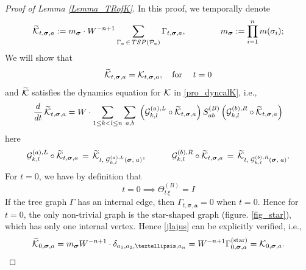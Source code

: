 \documentclass[10pt,reqno]{article}
\theoremstyle{plain} %
\theoremstyle{remark}
\numberwithin{equation}{section}
\begin{document}
\begin{proof}[Proof of Lemma \ref{Lemma_TRofK}]
 In this proof, we temporally denote 
   $$
   \widetilde{ {\cal K}}_{t, \boldsymbol{\sigma}, \textbf{a}}:= m_{\boldsymbol{\sigma}}\cdot W^{-n+1}    \sum_{\Gamma_{\textbf{a}}\, \in\,  {TSP}({\cal P}_{\textbf{a}})}  \Gamma_{t, \boldsymbol{\sigma}, \textbf{a}},\quad \quad \quad \quad m_{\boldsymbol{\sigma}}:=\prod_{i=1}^n m(\sigma_i);
   $$
   We will show that 
  \begin{equation}\label{jlajus}
     \widetilde{ {\cal K}}_{t, \boldsymbol{\sigma}, \textbf{a}}
   =
    { {\cal K}}_{t, \boldsymbol{\sigma}, \textbf{a}},\quad  \text{for} \; \quad  t=0   \end{equation}
and   $\widetilde{\cal K}$ satisfies the dynamics equation for $ \cal K$ in \eqref{pro_dyncalK}, i.e., 
  \begin{align}\label{pjlacalK}
       \frac{d}{dt}\, \widetilde{ {\cal K}}_{t, \boldsymbol{\sigma}, \textbf{a}} 
       =  
       {W}\cdot  \sum_{1 \le k < l \le n} \sum_{a, b} \; \left( {\cal G}^{(a), L}_{k, l} \circ  \widetilde{ {\cal K}}_{t, \boldsymbol{\sigma}, \textbf{a}} \right) S^{(B)}_{ab} \left( {\cal G}^{(b), R}_{k, l} \circ  \widetilde{ {\cal K}}_{t, \boldsymbol{\sigma}, \textbf{a}} \right)  
    \end{align}
    here
    $$
    {\cal G}^{(a), L}_{k, l} \circ  \widetilde{ {\cal K}}_{t, \boldsymbol{\sigma}, \textbf{a}}  \,=\,\widetilde{ {\cal K}}_{t, \; {\cal G}^{(a), L}_{k, l}\left( \boldsymbol{\sigma}, \; \textbf{a}\right) } ,\quad \quad 
    \quad 
    {\cal G}^{(b), R}_{k, l} \circ  \widetilde{ {\cal K}}_{t, \boldsymbol{\sigma}, \textbf{a}} 
    \,=\,\widetilde{ {\cal K}}_{t, \; {\cal G}^{(b), R}_{k, l}\left( \boldsymbol{\sigma}, \; \textbf{a}\right) }.
    $$
    For  $t = 0$, we have  by definition that 
    $$
    t = 0 \implies \Theta^{(B)}_{t\, \xi} = I 
    $$
    If the tree graph $\Gamma$ has an internal edge,  then $\Gamma_{t, \boldsymbol{\sigma}, \textbf{a}} = 0$ when $t = 0$. Hence for $t=0$, the  only non-trivial graph is the star-shaped graph (figure. \ref{fig_star}), which has only one internal vertex.
Hence  \eqref{jlajus} can be explicitly verified, i.e., 
$$
 \widetilde{{\cal K}}_{0, \boldsymbol{\sigma}, \textbf{a}} 
  =   m_{\boldsymbol{\sigma}} W^{ -n+1}\cdot\delta_{a_1, a_2, \dots, a_n}  
  = 
   W^{ -n+1}\Gamma^{(\text{star})}_{0, \boldsymbol{\sigma}, \textbf{a}} 
     = {\cal K}_{0, \boldsymbol{\sigma}, \textbf{a}} .
$$


\end{proof}
\end{document}
